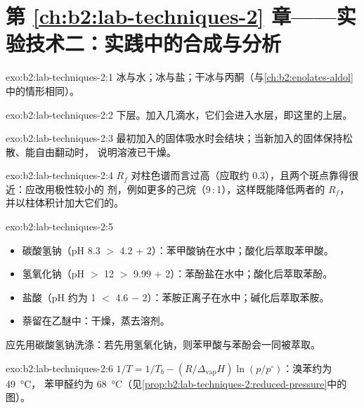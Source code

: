 \section*{第 \ref{ch:b2:lab-techniques-2} 章——实验技术二：实践中的合成与分析}

\begin{solution}{exo:b2:lab-techniques-2:1}
冰与水；冰与盐；干冰与丙酮（与\cref{ch:b2:enolates-aldol}中的情形相同）。
\end{solution}

\begin{solution}{exo:b2:lab-techniques-2:2}
下层。加入几滴水，它们会进入水层，即这里的上层。
\end{solution}

\begin{solution}{exo:b2:lab-techniques-2:3}
最初加入的固体吸水时会结块；当新加入的固体保持松散、能自由翻动时，
说明溶液已干燥。
\end{solution}

\begin{solution}{exo:b2:lab-techniques-2:4}
$R_f$ 对柱色谱而言过高（应取约 0.3），且两个斑点靠得很近：应改用极性较小的
剂，例如更多的己烷（9\,:\,1），这样既能降低两者的 $R_f$，
并以柱体积计加大它们的。
\end{solution}

\begin{solution}{exo:b2:lab-techniques-2:5}
\begin{itemize}
  \item 碳酸氢钠（pH 8.3 $>$ 4.2 + 2）：苯甲酸钠在水中；酸化后萃取苯甲酸。
  \item 氢氧化钠（pH $>$ 12 $>$ 9.99 + 2）：苯酚盐在水中；酸化后萃取苯酚。
  \item 盐酸（pH 约为 1 $<$ 4.6 $-$ 2）：苯胺正离子在水中；碱化后萃取苯胺。
  \item 萘留在乙醚中：干燥，蒸去溶剂。
\end{itemize}
应先用碳酸氢钠洗涤：若先用氢氧化钠，则苯甲酸与苯酚会一同被萃取。
\end{solution}

\begin{solution}{exo:b2:lab-techniques-2:6}
$1/T = 1/T_b - (R/\Delta_{\mathrm{vap}}H)\ln(p/p^\circ)$：溴苯约为 \qty{49}{\degreeCelsius}，
苯甲醛约为 \qty{68}{\degreeCelsius}（见\cref{prop:b2:lab-techniques-2:reduced-pressure}中的图）。
\end{solution}


